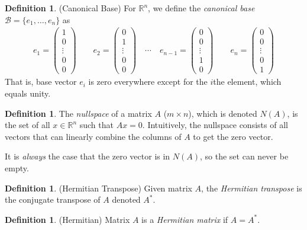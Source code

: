 \documentclass[12pt]{article}
\numberwithin{equation}{section} %
\theoremstyle{plain}
\theoremstyle{definition}
\newtheorem{defn}[thm]{Definition}
\theoremstyle{remark}
\newcommand{\Rn}{\mathbb{R}^n}
\begin{document}
\begin{defn}{(Canonical Base)}
For $\Rn$, we define the \emph{canonical base}
$\mathcal{B}=\{e_1,\ldots,e_n\}$ as
\begin{align*}
  e_1 =
  \begin{pmatrix}
  1 \\ 0 \\ \vdots \\ 0 \\ 0
  \end{pmatrix}
  \qquad
  e_2 =
  \begin{pmatrix}
  0 \\ 1 \\ \vdots \\ 0 \\ 0
  \end{pmatrix}
  \quad \cdots \quad
  e_{n-1} =
  \begin{pmatrix}
  0 \\ 0 \\ \vdots \\ 1 \\ 0
  \end{pmatrix}
  \qquad
  e_n =
  \begin{pmatrix}
  0 \\ 0 \\ \vdots \\ 0 \\ 1
  \end{pmatrix}
\end{align*}
That is, base vector $e_i$ is zero everywhere except for the $i$the
element, which equals unity.
\end{defn}

\begin{defn}
The \emph{nullspace} of a matrix $A$ ($m\times n$), which is denoted
$N(A)$, is the set of all $x \in \mathbb{R}^n$ such that $Ax=0$.
Intuitively, the nullspace consists of all vectors that can linearly
combine the columns of $A$ to get the zero vector.

It is \emph{always} the case that the zero vector is in $N(A)$, so the
set can never be empty.
\end{defn}

\begin{defn}{(Hermitian Transpose)}
Given matrix $A$, the \emph{Hermitian transpose} is the conjugate
transpose of $A$ denoted $A^*$.
\end{defn}

\begin{defn}{(Hermitian)}
Matrix $A$ is a \emph{Hermitian matrix} if $A=A^*$.
\end{defn}
\end{document}
